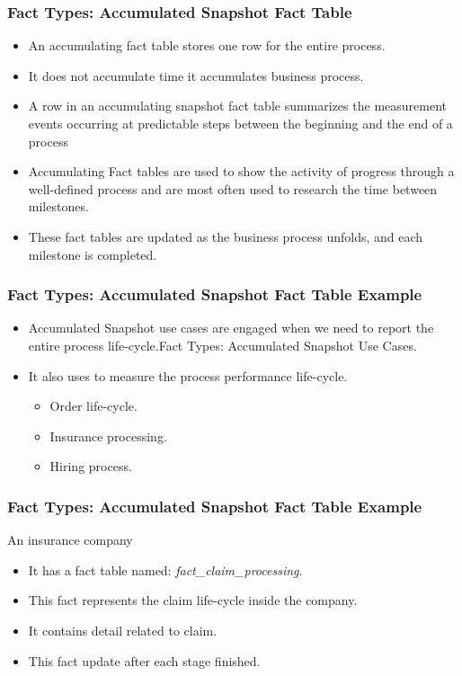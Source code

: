 \begin{frame}
	\frametitle{Fact Types: Accumulated Snapshot Fact Table}
	\begin{itemize}
		\item An accumulating fact table stores one row for the entire process.
		\item It does not accumulate time it accumulates business process.
		\item A row in an accumulating snapshot fact table summarizes the measurement events occurring at predictable steps between the beginning and the end of a process
		\item Accumulating Fact tables are used to show the activity of progress through a well-defined process and are most often used to research the time between milestones.
		\item These fact tables are updated as the business process unfolds, and each milestone is completed.
        
	\end{itemize}
\end{frame}
\begin{frame}
    \frametitle{Fact Types: Accumulated Snapshot Fact Table Example}
    \begin{itemize}
        \item Accumulated Snapshot use cases are engaged when we need to report the entire process life-cycle.Fact Types: Accumulated Snapshot Use Cases.        
        \item It also uses to measure the process performance life-cycle.
            \begin{itemize}
                \item Order life-cycle.
                \item Insurance processing.
                \item Hiring process.
            \end{itemize}       
    \end{itemize}
\end{frame}
\begin{frame}
    \frametitle{Fact Types: Accumulated Snapshot Fact Table Example}
    An insurance company
    \begin{itemize}
        \item It has a fact table named: \textit{fact\_claim\_processing}.
        \item This fact represents the claim life-cycle inside the company.
        \item It contains detail related to claim.
        \item This fact update after each stage finished.
    \end{itemize}
\end{frame}
